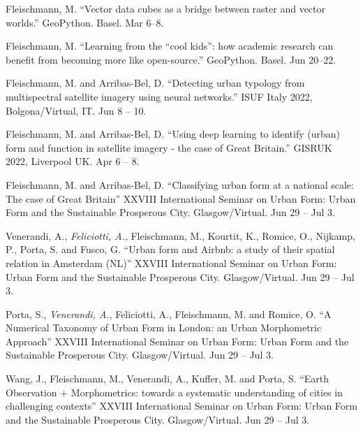 \documentclass[12pt,a4paper]{report}
\begin{document}
\begin{tablist}
        \item[2023] \tab{}Fleischmann, M. \enquote{Vector data cubes as a bridge between raster and vector worlds.} GeoPython. Basel. \@ Mar 6--8.

        \item[2022] \tab{}Fleischmann, M. \enquote{Learning from the “cool kids”: how academic research can benefit from becoming more like open-source.} GeoPython. Basel. \@ Jun 20--22.

        \item[2022] \tab{}Fleischmann, M. and Arribas-Bel, D. \enquote{Detecting urban typology from multispectral satellite imagery using neural networks.} ISUF Italy 2022, Bolgona/Virtual, IT. Jun 8 -- 10.

        \item[2022] \tab{}Fleischmann, M. and Arribas-Bel, D. \enquote{Using deep learning to identify (urban) form and function in satellite imagery - the case of Great Britain.} GISRUK 2022, Liverpool UK. Apr 6 -- 8.

        \item[2021] \tab{}Fleischmann, M. and Arribas-Bel, D. \enquote{Classifying urban form at a national scale: The case of Great Britain} XXVIII International Seminar on Urban Form: Urban Form and the Sustainable Prosperous City. Glasgow/Virtual. \@ Jun 29 -- Jul 3.

        \item[2021] \tab{}Venerandi, A., \textit{Feliciotti, A.}, Fleischmann, M., Kourtit, K., Romice, O., Nijkamp, P., Porta, S. and Fusco, G. \enquote{Urban form and Airbnb: a study of their spatial relation in Amsterdam (NL)} XXVIII International Seminar on Urban Form: Urban Form and the Sustainable Prosperous City. Glasgow/Virtual. \@ Jun 29 -- Jul 3.

        \item[2021] \tab{}Porta, S., \textit{Venerandi, A.}, Feliciotti, A., Fleischmann, M. and Romice, O. \enquote{A Numerical Taxonomy of Urban Form in London: an Urban Morphometric Approach} XXVIII International Seminar on Urban Form: Urban Form and the Sustainable Prosperous City. Glasgow/Virtual. \@ Jun 29 -- Jul 3.

        \item[2021] \tab{}Wang, J., Fleischmann, M., Venerandi, A., Kuffer, M. and Porta, S. \enquote{Earth Observation + Morphometrics: towards a systematic understanding of cities in challenging contexts} XXVIII International Seminar on Urban Form: Urban Form and the Sustainable Prosperous City. Glasgow/Virtual. \@ Jun 29 -- Jul 3.


\end{tablist}
\end{document}
